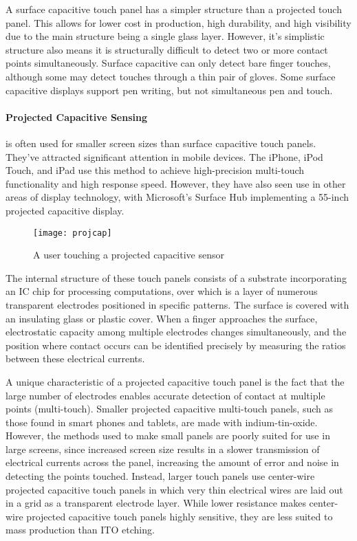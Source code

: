 A surface capacitive touch panel has a simpler structure than a projected touch panel.
This allows for lower cost in production, high durability, and high visibility due to the main structure being a single glass layer. 
However, it's simplistic structure also means it is structurally difficult to detect two or more contact points simultaneously.
Surface capacitive can only detect bare finger touches, although some may detect touches through a thin pair of gloves.
Some surface capacitive displays support pen writing, but not simultaneous pen and touch.

\paragraph{Projected Capacitive Sensing}

is often used for smaller screen sizes than surface capacitive touch panels. 
They've attracted significant attention in mobile devices. 
The iPhone, iPod Touch, and iPad use this method to achieve high-precision multi-touch functionality and high response speed.
However, they have also seen use in other areas of display technology, with Microsoft's Surface Hub implementing a 55-inch projected capacitive display.

\begin{figure}
\texttt{[image: projcap]}
\caption{A user touching a projected capacitive sensor \cite{touchtech}}
\end{figure}

The internal structure of these touch panels consists of a substrate incorporating an IC chip for processing computations, over which is a layer of numerous transparent electrodes positioned in specific patterns. 
The surface is covered with an insulating glass or plastic cover. 
When a finger approaches the surface, electrostatic capacity among multiple electrodes changes simultaneously, and the position where contact occurs can be identified precisely by measuring the ratios between these electrical currents.

A unique characteristic of a projected capacitive touch panel is the fact that the large number of electrodes enables accurate detection of contact at multiple points (multi-touch).
Smaller projected capacitive multi-touch panels, such as those found in smart phones and tablets, are made with indium-tin-oxide.
However, the methods used to make small panels are poorly suited for use in large screens, since increased screen size results in a slower transmission of electrical currents across the panel, increasing the amount of error and noise in detecting the points touched.
Instead, larger touch panels use center-wire projected capacitive touch panels in which very thin electrical wires are laid out in a grid as a transparent electrode layer.
While lower resistance makes center-wire projected capacitive touch panels highly sensitive, they are less suited to mass production than ITO etching.

